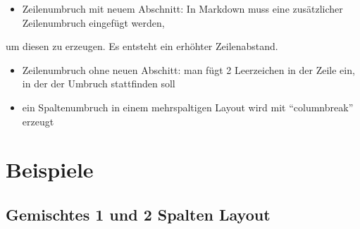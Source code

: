 \documentclass[
  a4paper,
  twoside]{article}
\providecommand{\tightlist}{%
  \setlength{\itemsep}{0pt}\setlength{\parskip}{0pt}}
\begin{document}
\begin{itemize}
\tightlist
\item
  Zeilenumbruch mit neuem Abschnitt: In Markdown muss eine zusätzlicher Zeilenumbruch eingefügt werden,
\end{itemize}

um diesen zu erzeugen. Es entsteht ein erhöhter Zeilenabstand.

\begin{itemize}
\item
  Zeilenumbruch ohne neuen Abschitt: man fügt 2 Leerzeichen in der Zeile ein,\\
  in der der Umbruch stattfinden soll
\item
  ein Spaltenumbruch in einem mehrspaltigen Layout wird mit ``columnbreak'' erzeugt
\end{itemize}

\newpage

\hypertarget{beispiele-1}{%
\section{Beispiele}\label{beispiele-1}}

\hypertarget{gemischtes-1-und-2-spalten-layout}{%
\subsection{Gemischtes 1 und 2 Spalten Layout}\label{gemischtes-1-und-2-spalten-layout}}
\end{document}

